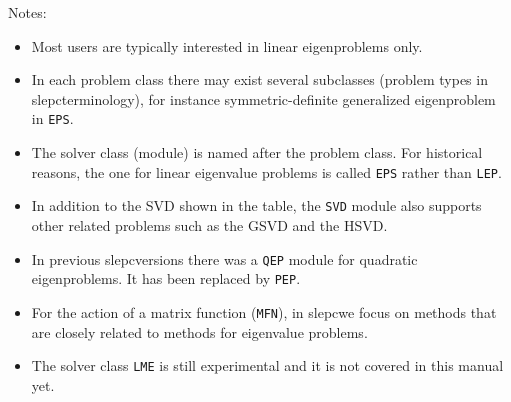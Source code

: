 \documentclass[titlepage,10pt,a4paper]{book}
\newcommand{\packnoi}[1]{{\sc #1}\xspace}
\newcommand{\slepc}{\texorpdfstring{\packnoi{slep\rm c}}{{SLEPc}}}
\begin{document}
{\noindent Notes:\vspace{-2mm}
\begin{itemize}
\setlength{\itemsep}{-2pt}
\item Most users are typically interested in linear eigenproblems only.
\item In each problem class there may exist several subclasses (problem types in \slepc terminology), for instance symmetric-definite generalized eigenproblem in \texttt{EPS}.
\item The solver class (module) is named after the problem class. For historical reasons, the one for linear eigenvalue problems is called \texttt{EPS} rather than \texttt{LEP}.
\item In addition to the SVD shown in the table, the \texttt{SVD} module also supports other related problems such as the GSVD and the HSVD.
\item In previous \slepc versions there was a \texttt{QEP} module for quadratic eigenproblems. It has been replaced by \texttt{PEP}. %
\item For the action of a matrix function (\texttt{MFN}), in \slepc we focus on methods that are closely related to methods for eigenvalue problems.
\item The solver class \texttt{LME} is still experimental and it is not covered in this manual yet.
\end{itemize}

  \setlength{\parskip}{0cm}
  \tableofcontents
}
\cleardoublepage
{}
\pagestyle{fancy}
\renewcommand{\chaptermark}[1]{\markboth{\scriptsize \sffamily {\bfseries\chaptername\ \thechapter.} #1}{}}
\renewcommand{\sectionmark}[1]{\markright{\scriptsize \sffamily {\bfseries\thesection.} #1}{}}
\fancyhead{}
\fancyhead[LE,RO]{\nouppercase{\rightmark}}
\fancyhead[LO,RE]{\nouppercase{\leftmark}}
\fancyfoot[C]{\scriptsize --- \thepage\ ---}
\renewcommand{\headrulewidth}{0.2pt}
\renewcommand{\footrulewidth}{0.2pt}










\cleardoublepage
\fancyhead{}

%
%

\end{document}
